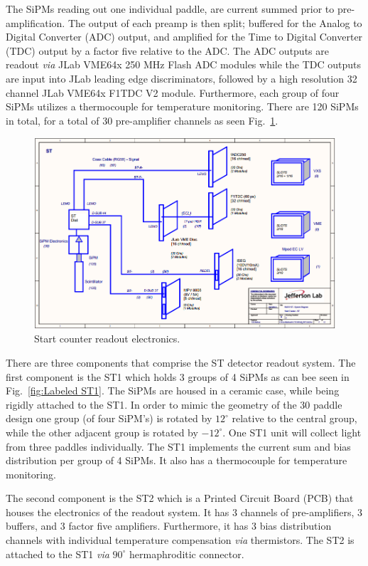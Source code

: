 The SiPMs reading out one individual paddle, are current summed prior to pre-amplification.  The output of each preamp is then split; buffered for the Analog to Digital Converter (ADC) output, and amplified for the Time to Digital Converter (TDC) output by a factor five relative to the ADC.  The ADC outputs are readout \emph{via} JLab VME64x 250 MHz Flash ADC modules while the TDC outputs are input into JLab leading edge discriminators, followed by a high resolution 32 channel JLab VME64x F1TDC V2 module.  Furthermore, each group of four SiPMs utilizes a thermocouple for temperature monitoring. There are 120 SiPMs in total, for a total of 30 pre-amplifier channels as seen Fig.~\ref{fig:Start Counter Electronics}.
\begin{figure}[!htb]
	\centering
	\includegraphics[width=1.0\columnwidth]{design/figs/ST_Electronics}
	\caption[Start counter readout electronics]{Start counter readout electronics.}
	\label{fig:Start Counter Electronics}
\end{figure}

There are three components that comprise the ST detector readout system.  The first component is the ST1 which holds 3 groups of 4 SiPMs as can bee seen in Fig.~\ref{fig:Labeled ST1}.  The SiPMs are housed in a ceramic case, while being rigidly attached to the ST1.  In order to mimic the geometry of the 30 paddle design one group (of four SiPM's) is rotated by $12^{\circ}$ relative to the central group, while the other adjacent group is rotated by $-12^{\circ}$.  One ST1 unit will collect light from three paddles individually.  The ST1 implements the current sum and bias distribution per group of 4 SiPMs.  It also has a thermocouple for temperature monitoring.  

The second component is the ST2 which is a Printed Circuit Board (PCB) that houses the electronics of the readout system.  It has 3 channels of pre-amplifiers, 3 buffers, and 3 factor five amplifiers.  Furthermore, it has 3 bias distribution channels with individual temperature compensation \emph{via} thermistors.  The ST2 is attached to the ST1 \emph{via} $90^{\circ}$ hermaphroditic connector.  

